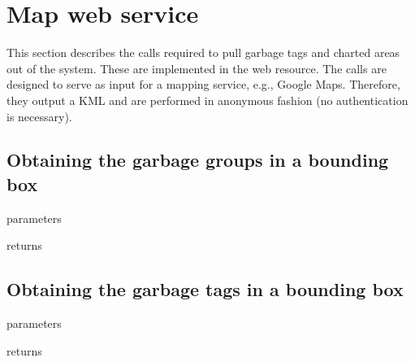 \section{Map web service}
\label{sec:call:map}

This section describes the calls required to pull garbage tags and charted areas
out of the system. These are implemented in the
 web resource. The
calls are designed to serve as input for a mapping service, e.g., Google Maps.
Therefore, they output a KML and are performed in anonymous fashion (no
authentication is necessary).

\subsection{Obtaining the garbage groups in a bounding box}

\begin{apidata}{parameters}
  \begin{datalist}
  \end{datalist}
\end{apidata}
\begin{apidata}{returns}
  \begin{datalist}
  \end{datalist}
\end{apidata}


\subsection{Obtaining the garbage tags in a bounding box}

\begin{apidata}{parameters}
  \begin{datalist}
  \end{datalist}
\end{apidata}
\begin{apidata}{returns}
  \begin{datalist}
  \end{datalist}
\end{apidata}

